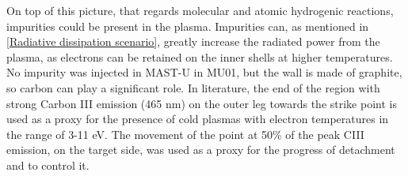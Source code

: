 On top of this picture, that regards molecular and atomic hydrogenic reactions, impurities could be present in the plasma. Impurities can, as mentioned in \autoref{Radiative dissipation scenario}, greatly increase the radiated power from the plasma, as electrons can be retained on the inner shells at higher temperatures. No impurity was injected in MAST-U in MU01, but the wall is made of graphite, so carbon can play a significant role. In literature, the end of the region with strong Carbon III emission (465 nm) on the outer leg towards the strike point is used as a proxy for the presence of cold plasmas with electron temperatures in the range of 3-11 eV.\cite{Reimerdes2017,Smolders2020a,Harrison2017} The movement of the point at 50\% of the peak CIII emission, on the target side, was used as a proxy for the progress of detachment and to control it.\cite{Ravensbergen2020}

